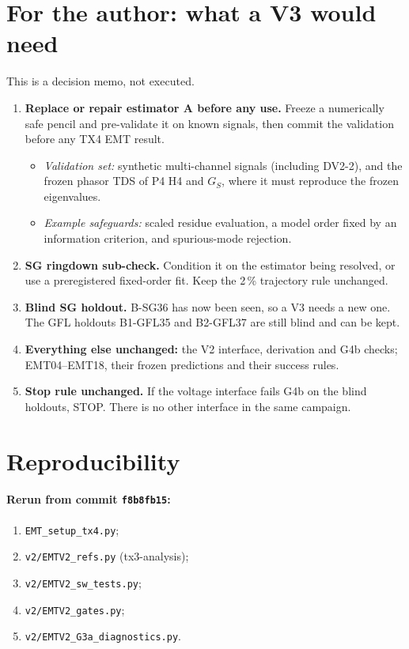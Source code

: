 \documentclass[10pt,a4paper]{article}
\newcommand{\f}[1]{\nolinkurl{#1}}
\begin{document}
\section{For the author: what a V3 would need}

This is a decision memo, not executed.
\begin{enumerate}
\item \textbf{Replace or repair estimator A before any use.} Freeze a numerically
  safe pencil and pre-validate it on known signals, then commit the validation
  before any TX4 EMT result.
  \begin{itemize}
  \item \emph{Validation set:} synthetic multi-channel signals (including
    DV2-2), and the frozen phasor TDS of P4 H4 and $G_S$, where it must reproduce
    the frozen eigenvalues.
  \item \emph{Example safeguards:} scaled residue evaluation, a model order fixed
    by an information criterion, and spurious-mode rejection.
  \end{itemize}
\item \textbf{SG ringdown sub-check.} Condition it on the estimator being
  resolved, or use a preregistered fixed-order fit. Keep the 2\,\% trajectory
  rule unchanged.
\item \textbf{Blind SG holdout.} B-SG36 has now been seen, so a V3 needs a new
  one. The GFL holdouts B1-GFL35 and B2-GFL37 are still blind and can be kept.
\item \textbf{Everything else unchanged:} the V2 interface, derivation and G4b
  checks; EMT04--EMT18, their frozen predictions and their success rules.
\item \textbf{Stop rule unchanged.} If the voltage interface fails G4b on the
  blind holdouts, STOP. There is no other interface in the same campaign.
\end{enumerate}

\section{Reproducibility}

\paragraph{Rerun from commit \texttt{f8b8fb15}:}
\begin{enumerate}
\item \f{EMT_setup_tx4.py};
\item \f{v2/EMTV2_refs.py} (tx3-analysis);
\item \f{v2/EMTV2_sw_tests.py};
\item \f{v2/EMTV2_gates.py};
\item \f{v2/EMTV2_G3a_diagnostics.py}.
\end{enumerate}
\end{document}
